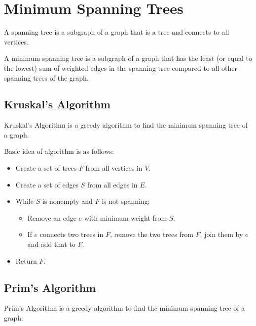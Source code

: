     \section{Minimum Spanning Trees}
        A spanning tree is a subgraph of a graph that is a tree and connects to
        all vertices.

        A minimum spanning tree is a subgraph of a graph that has the least (or
        equal to the lowest) sum of weighted edges in the spanning tree compared
        to all other spanning trees of the graph.

        \subsection{Kruskal's Algorithm}
            Kruskal's Algorithm is a greedy algorithm to find the minimum
            spanning tree of a graph.

            Basic idea of algorithm is as follows:
            \begin{itemize}
                \item Create a set of trees $F$ from all vertices in $V$.
                \item Create a set of edges $S$ from all edges in $E$.
                \item While $S$ is nonempty and $F$ is not spanning:
                    \begin{itemize}
                        \item Remove an edge $e$ with minimum weight from $S$.
                        \item If $e$ connects two trees in $F$, remove the two
                        trees from $F$, join them by $e$ and add that to $F$.
                    \end{itemize}
                \item Return $F$.
            \end{itemize}
        \subsection{Prim's Algorithm}
            Prim's Algorithm is a greedy algorithm to find the minimum
            spanning tree of a graph.


